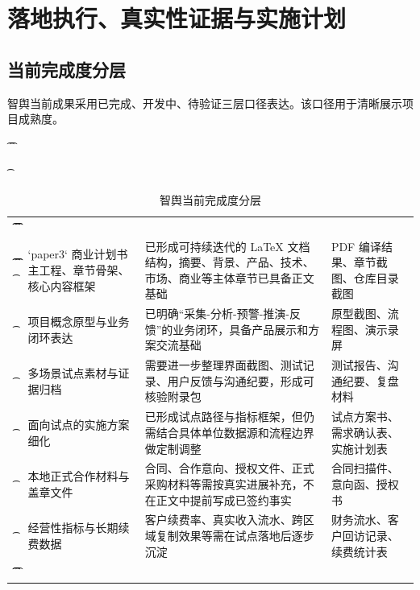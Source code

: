 \chapter{落地执行、真实性证据与实施计划}

\section{当前完成度分层}

智舆当前成果采用已完成、开发中、待验证三层口径表达。该口径用于清晰展示项目成熟度。

\begin{table}[htbp]
	\t\centering
	\t\caption{智舆当前完成度分层}
	\t\begin{tabularx}{\textwidth}{|L{2.2cm}L{4.1cm}YL{3.3cm}|}
		\t\t\toprule
		\t\t{} &                 &                                      &        \\
		\t\t\midrule
		\t\t{}
		\t{}          & `paper3` 商业计划书主工程、章节骨架、核心内容框架 & 已形成可持续迭代的 LaTeX 文档结构，摘要、背景、产品、技术、市场、商业等主体章节已具备正文基础 & PDF 编译结果、章节截图、仓库目录截图 \\
		\t{}          & 项目概念原型与业务闭环表达                 & 已明确“采集-分析-预警-推演-反馈”的业务闭环，具备产品展示和方案交流基础             & 原型截图、流程图、演示录屏        \\
		\t{}          & 多场景试点素材与证据归档                  & 需要进一步整理界面截图、测试记录、用户反馈与沟通纪要，形成可核验附录包                & 测试报告、沟通纪要、复盘材料       \\
		\t{}          & 面向试点的实施方案细化                   & 已形成试点路径与指标框架，但仍需结合具体单位数据源和流程边界做定制调整                & 试点方案书、需求确认表、实施计划表    \\
		\t{}          & 本地正式合作材料与盖章文件                 & 合同、合作意向、授权文件、正式采购材料等需按真实进展补充，不在正文中提前写成已签约事实        & 合同扫描件、意向函、授权书        \\
		\t{}          & 经营性指标与长期续费数据                  & 客户续费率、真实收入流水、跨区域复制效果等需在试点落地后逐步沉淀                   & 财务流水、客户回访记录、续费统计表    \\
		\t\t\bottomrule
		\t\end{tabularx}
\end{table}

